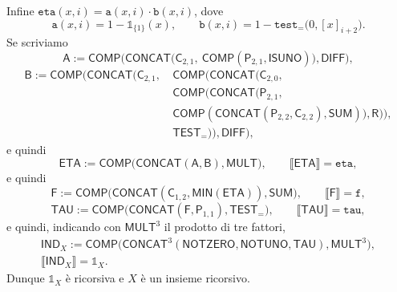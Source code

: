 \begin{sol}
\begin{enumerate}
Infine $\texttt{eta}(x,i)=\texttt{a}(x,i)\cdot\texttt{b}(x,i)$, dove
\[
\texttt{a}(x,i)=1-\mathbb 1_{\{1\}}(x),\qquad
\texttt{b}(x,i)=1-\texttt{test}_{=}\big(0,[x]_{i+2}\big).
\]
Se scriviamo
\[
\mathsf A:=\mathsf{COMP}\big(\mathsf{CONCAT}\big(\mathsf C_{2,1},\ \mathsf{COMP}(\mathsf P_{2,1},\mathsf{ISUNO})\big),\mathsf{DIFF}\big),
\]
\[
\begin{aligned}
\mathsf B:=\mathsf{COMP}\Big(\mathsf{CONCAT}\Big(\mathsf C_{2,1},\ &\mathsf{COMP}\big(\mathsf{CONCAT}\big(\mathsf C_{2,0},\\
&\mathsf{COMP}\big(\mathsf{CONCAT}\big(\mathsf P_{2,1},\\
&\mathsf{COMP}(\mathsf{CONCAT}(\mathsf P_{2,2},\mathsf C_{2,2}),\mathsf{SUM})\big),\mathsf R\big)\big),\\
&\mathsf{TEST}_{=}\big)\Big),\mathsf{DIFF}\Big),
\end{aligned}
\]
e quindi
\[
\mathsf{ETA}:=\mathsf{COMP}\big(\mathsf{CONCAT}(\mathsf A,\mathsf B),\mathsf{MULT}\big),\qquad \llbracket\mathsf{ETA}\rrbracket=\texttt{eta},
\]
e quindi
\[
\mathsf F:=\mathsf{COMP}\big(\mathsf{CONCAT}(\mathsf C_{1,2},\mathsf{MIN}(\mathsf{ETA})),\mathsf{SUM}\big),\qquad \llbracket\mathsf F\rrbracket=\texttt{f},
\]
\[
\mathsf{TAU}:=\mathsf{COMP}\big(\mathsf{CONCAT}(\mathsf F,\mathsf P_{1,1}),\mathsf{TEST}_{=}\big),\qquad \llbracket\mathsf{TAU}\rrbracket=\texttt{tau},
\]
e quindi, indicando con $\mathsf{MULT}^3$ il prodotto di tre fattori,
\begin{gather*}
\mathsf{IND}_X:=\mathsf{COMP}\big(\mathsf{CONCAT}^3(\mathsf{NOTZERO},\mathsf{NOTUNO},\mathsf{TAU}),\mathsf{MULT}^3\big),\\
\llbracket\mathsf{IND}_X\rrbracket=\mathbb 1_X.
\end{gather*}
Dunque $\mathbb 1_X$ è ricorsiva e $X$ è un insieme ricorsivo.
\end{enumerate}
\end{sol}

\newpage